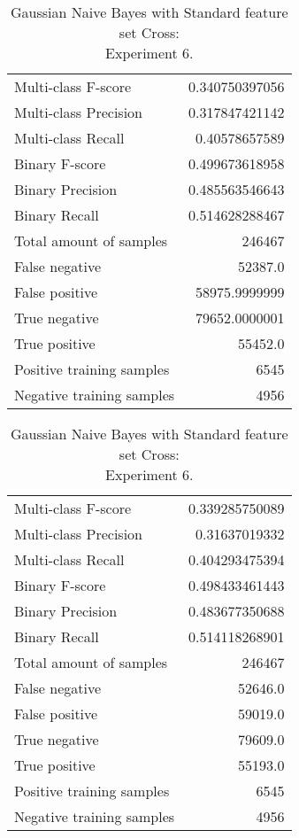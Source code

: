 \begin{table}[H]
\begin{minipage}{0.5\textwidth}
\caption{Gaussian Naive Bayes with Standard feature set Cross: \\Experiment 5.}
\centering
\begin{tabular}{l r}
\toprule
Multi-class F-score & 0.340750397056 \\
Multi-class Precision & 0.317847421142 \\
Multi-class Recall & 0.40578657589 \\
\midrule
Binary F-score & 0.499673618958 \\
Binary Precision & 0.485563546643 \\
Binary Recall & 0.514628288467 \\
\midrule
Total amount of samples & 246467 \\
False negative & 52387.0 \\
False positive & 58975.9999999 \\
True negative & 79652.0000001 \\
True positive & 55452.0 \\
\midrule
Positive training samples & 6545 \\
Negative training samples & 4956 \\
\bottomrule
\end{tabular}
\end{minipage}
\hfillx
\begin{minipage}{0.5\textwidth}
\caption{Gaussian Naive Bayes with Standard feature set Cross: \\Experiment 6.}
\centering
\begin{tabular}{l r}
\toprule
Multi-class F-score & 0.339285750089 \\
Multi-class Precision & 0.31637019332 \\
Multi-class Recall & 0.404293475394 \\
\midrule
Binary F-score & 0.498433461443 \\
Binary Precision & 0.483677350688 \\
Binary Recall & 0.514118268901 \\
\midrule
Total amount of samples & 246467 \\
False negative & 52646.0 \\
False positive & 59019.0 \\
True negative & 79609.0 \\
True positive & 55193.0 \\
\midrule
Positive training samples & 6545 \\
Negative training samples & 4956 \\
\bottomrule
\end{tabular}
\end{minipage}
\end{table}
